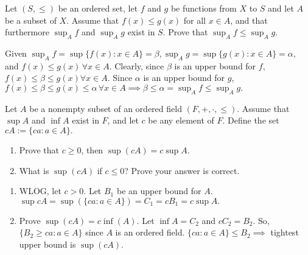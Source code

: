 \documentclass[12pt,letterpaper,boxed]{hmcpset}
\begin{document}
\begin{problem}[Exercise 1.7.]
Let $(S,\leq)$ be an ordered set, let $f$ and $g$ be functions from $X$ to $S$ and let $A$ be a subset of $X$. Assume that $f(x)\leq g(x)$ for all $x \in A$, and that furthermore $\sup_A f$ and $\sup_A g$ exist in $S$. Prove that $\sup_A f \leq \sup_A g.$
 \end{problem}

\begin{solution}
Given $\sup_{A}f=\sup\{f(x) : x \in A\}=\beta, \sup_{A}g=\sup\{g(x) : x \in A\}=\alpha,$ and $f(x) \leq g(x)\, \forall x \in A$. Clearly, since $\beta$ is an upper bound for $f$, $f(x)\leq \beta \leq g(x) \forall x\in A.$ Since $\alpha$ is an upper bound for $g$, $f(x)\leq \beta \leq g(x) \leq \alpha\, \forall x\in A \implies \beta \leq \alpha = \sup_A f \leq \sup_A g. $ 
\end{solution}

\begin{problem}[Exercise 2.3.]
Let $A$ be a nonempty subset of an ordered field $(F,+,\cdot,\leq)$. Assume that $\sup A$ and $\inf A$ exist in $F$, and let $c$ be any element of $F$. Define the set $cA := \{ ca : a \in A\}.$

\vspace{-2mm}
\begin{enumerate}
	\itemsep0em
	\item Prove that $ c \ge 0$, then $\sup(cA) = c\sup A.$ 
	\item What is $\sup(cA)$ if $c \le 0$? Prove your answer is correct.
\end{enumerate}

\end{problem}

\begin{solution}
\vspace{-2mm}
\begin{enumerate}
	\itemsep0em
	\item WLOG, let $c > 0.$ Let $B_1$ be an upper bound for $A$. $\sup cA = \sup(\{ ca : a \in A\})=C_1=cB_1=c\sup A.$
	\item Prove $\sup(cA) = c\inf(A).$ Let $\inf A = C_2$ and $cC_2=B_2$. So, $\{ B_2 \ge ca : a \in A\}$ since $A$ is an ordered field. $\{ ca : a\in A \}\leq B_2 \implies$ tightest upper bound is $\sup(cA).$   
\end{enumerate}
\end{solution}
\end{document}
